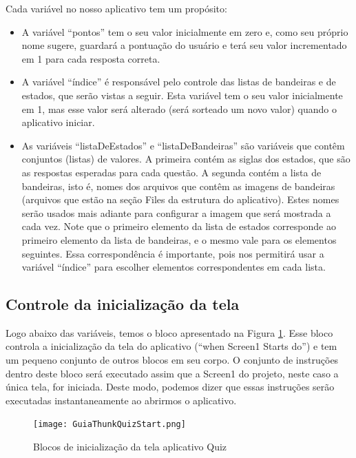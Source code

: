\documentclass[11pt,fleqn]{book} %
\begin{document}
Cada variável no nosso aplicativo tem um propósito:
\begin{itemize}
    \item A variável ``pontos'' tem o seu valor inicialmente em zero e, como seu próprio nome sugere, guardará a pontuação do usuário e terá seu valor incrementado em 1 para cada resposta correta. 
    \item A variável ``índice'' é responsável pelo controle das listas de bandeiras e de estados, que serão vistas a seguir. Esta variável tem o seu valor inicialmente em 1, mas esse valor será alterado (será sorteado um novo valor) quando o aplicativo iniciar.
    \item As variáveis ``listaDeEstados'' e ``listaDeBandeiras'' são variáveis que contêm conjuntos (listas) de valores. A primeira contém as siglas dos estados, que são as respostas esperadas para cada questão. A segunda contém a lista de bandeiras, isto é, nomes dos arquivos que contêm as imagens de bandeiras (arquivos que estão na seção Files da estrutura do aplicativo). Estes nomes serão usados mais adiante para configurar a imagem que será mostrada a cada vez.
    Note que o primeiro elemento da lista de estados corresponde ao primeiro elemento da lista de bandeiras, e o mesmo vale para os elementos seguintes. Essa correspondência é importante, pois nos permitirá usar a variável ``índice'' para escolher elementos correspondentes em cada lista.

\end{itemize}


 
\subsection{Controle da inicialização da tela}


Logo abaixo das variáveis, temos o bloco apresentado na Figura \ref{fig:quizstart}. Esse bloco controla a inicialização da tela do aplicativo (``when Screen1 Starts do'') e tem um pequeno conjunto de outros blocos em seu corpo. O conjunto de instruções dentro deste bloco será executado assim que a Screen1 do projeto, neste caso a única tela, for iniciada. Deste modo, podemos dizer que essas instruções serão executadas instantaneamente ao abrirmos o aplicativo.


\begin{figure}[H]
	\centering
	\texttt{[image: GuiaThunkQuizStart.png]}\hspace{0.2cm}
    \caption{Blocos de inicialização da tela aplicativo Quiz}\label{fig:quizstart}
\end{figure} 
\end{document}
